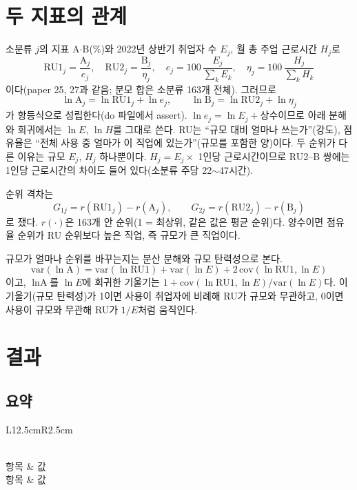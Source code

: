\documentclass[11pt]{article}
\begin{document}
\section{두 지표의 관계}

소분류 $j$의 지표 A$\cdot$B(\%)와 2022년 상반기 취업자 수 $E_j$, 월 총 주업 근로시간 $H_j$로
\[
\mathrm{RU1}_j = \frac{\text{A}_j}{e_j}, \quad \mathrm{RU2}_j = \frac{\text{B}_j}{\eta_j}, \quad
e_j = 100\,\frac{E_j}{\sum_k E_k}, \quad \eta_j = 100\,\frac{H_j}{\sum_k H_k}
\]
이다(paper 25, 27과 같음; 분모 합은 소분류 163개 전체). 그러므로
\[
\ln \text{A}_j = \ln \mathrm{RU1}_j + \ln e_j, \qquad
\ln \text{B}_j = \ln \mathrm{RU2}_j + \ln \eta_j
\]
가 항등식으로 성립한다(do 파일에서 assert). $\ln e_j = \ln E_j + \text{상수}$이므로 아래 분해와 회귀에서는 $\ln E$, $\ln H$를 그대로 쓴다. RU는 ``규모 대비 얼마나 쓰는가''(강도), 점유율은 ``전체 사용 중 얼마가 이 직업에 있는가''(규모를 포함한 양)이다. 두 순위가 다른 이유는 규모 $E_j$, $H_j$ 하나뿐이다. $H_j = E_j \times$ 1인당 근로시간이므로 RU2--B 쌍에는 1인당 근로시간의 차이도 들어 있다(소분류 주당 22$\sim$47시간).

순위 격차는
\[
G_{1j} = r(\mathrm{RU1}_j) - r(\text{A}_j), \qquad G_{2j} = r(\mathrm{RU2}_j) - r(\text{B}_j)
\]
로 쟀다. $r(\cdot)$은 163개 안 순위(1 = 최상위, 같은 값은 평균 순위)다. 양수이면 점유율 순위가 RU 순위보다 높은 직업, 즉 규모가 큰 직업이다.

규모가 얼마나 순위를 바꾸는지는 분산 분해와 규모 탄력성으로 본다.
\[
\mathrm{var}(\ln \text{A}) = \mathrm{var}(\ln \mathrm{RU1}) + \mathrm{var}(\ln E) + 2\,\mathrm{cov}(\ln \mathrm{RU1}, \ln E)
\]
이고, $\ln \text{A}$를 $\ln E$에 회귀한 기울기는 $1 + \mathrm{cov}(\ln \mathrm{RU1}, \ln E)/\mathrm{var}(\ln E)$다. 이 기울기(규모 탄력성)가 1이면 사용이 취업자에 비례해 RU가 규모와 무관하고, 0이면 사용이 규모와 무관해 RU가 $1/E$처럼 움직인다.

\section{결과}

\subsection{요약}

\begin{longtable}{L{12.5cm}R{2.5cm}}
\caption{상대 활용도와 점유율 지표의 순위 관계, 분산 분해, 규모 탄력성(소분류 163개; 분산 분해와 탄력성은 사용 > 0인 129개)}\label{tab:summary}\\
\toprule
항목 & 값 \\
\midrule
\endfirsthead
\toprule
항목 & 값 \\
\midrule
\endhead

\bottomrule
\end{longtable}
\end{document}
